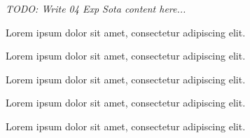 \textit{TODO: Write 04 Exp Sota content here...}
\par Lorem ipsum dolor sit amet, consectetur adipiscing elit. \par Lorem ipsum dolor sit amet, consectetur adipiscing elit. \par Lorem ipsum dolor sit amet, consectetur adipiscing elit. \par Lorem ipsum dolor sit amet, consectetur adipiscing elit. \par Lorem ipsum dolor sit amet, consectetur adipiscing elit. 
